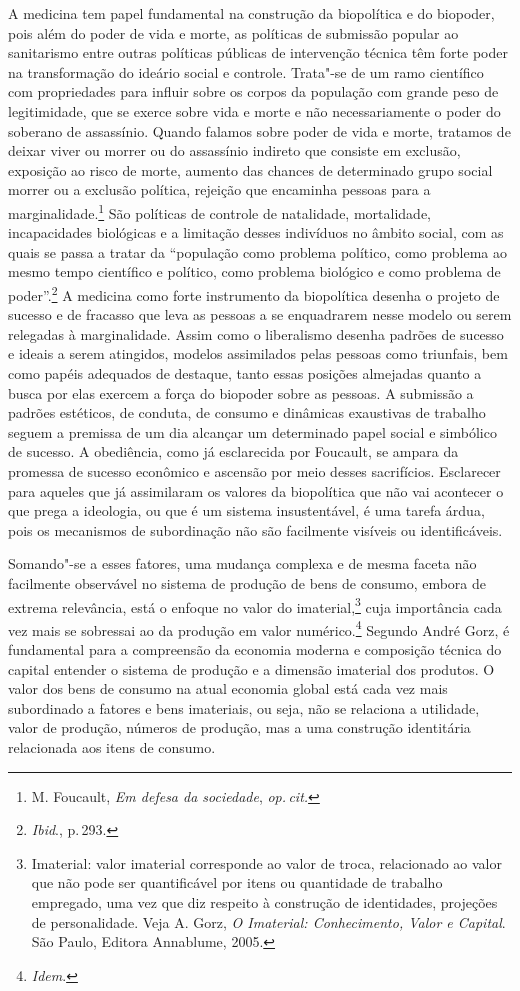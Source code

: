 A medicina tem papel fundamental na construção da biopolítica e do
biopoder, pois além do poder de vida e morte, as políticas de submissão
popular ao sanitarismo entre outras políticas públicas de intervenção
técnica têm forte poder na transformação do ideário social e controle.
Trata"-se de um ramo científico com propriedades para influir sobre os
corpos da população com grande peso de legitimidade, que se exerce sobre
vida e morte e não necessariamente o poder do soberano de assassínio.
Quando falamos sobre poder de vida e morte, tratamos de deixar viver ou
morrer ou do assassínio indireto que consiste em exclusão, exposição ao
risco de morte, aumento das chances de determinado grupo social morrer
ou a exclusão política, rejeição que encaminha pessoas para a
marginalidade.\footnote{M. Foucault, \textit{Em defesa da sociedade}, \textit{op.\,cit.}} São políticas de controle de natalidade,
mortalidade, incapacidades biológicas e a limitação desses indivíduos no
âmbito social, com as quais se passa a tratar da ``população como
problema político, como problema ao mesmo tempo científico e político,
como problema biológico e como problema de poder''.\footnote{\textit{Ibid}., p.\,293.} A medicina como
forte instrumento da biopolítica desenha o projeto de sucesso e de
fracasso que leva as pessoas a se enquadrarem nesse modelo ou serem
relegadas à marginalidade. Assim como o liberalismo desenha padrões de
sucesso e ideais a serem atingidos, modelos assimilados pelas pessoas
como triunfais, bem como papéis adequados de destaque, tanto essas
posições almejadas quanto a busca por elas exercem a força do biopoder
sobre as pessoas. A submissão a padrões estéticos, de conduta, de
consumo e dinâmicas exaustivas de trabalho seguem a premissa de um dia
alcançar um determinado papel social e simbólico de sucesso. A
obediência, como já esclarecida por Foucault, se ampara da promessa
de sucesso econômico e ascensão por meio desses sacrifícios. Esclarecer
para aqueles que já assimilaram os valores da biopolítica que não vai
acontecer o que prega a ideologia, ou que é um sistema insustentável, é
uma tarefa árdua, pois os mecanismos de subordinação não são facilmente
visíveis ou identificáveis.

Somando"-se a esses fatores, uma mudança complexa e de mesma faceta não
facilmente observável no sistema de produção de bens de consumo, embora
de extrema relevância, está o enfoque no valor do imaterial,\footnote{Imaterial:
  valor imaterial corresponde ao valor de troca, relacionado ao valor
  que não pode ser quantificável por itens ou quantidade de trabalho
  empregado, uma vez que diz respeito à construção de identidades,
  projeções de personalidade. Veja A. Gorz, \textit{O Imaterial: Conhecimento, Valor e Capital}. São Paulo, Editora Annablume, 2005.} cuja importância cada vez
mais se sobressai ao da produção em valor numérico.\footnote{\textit{Idem}.} Segundo
André Gorz, é fundamental para a compreensão da economia moderna e
composição técnica do capital entender o sistema de produção e a
dimensão imaterial dos produtos. O valor dos bens de consumo na atual
economia global está cada vez mais subordinado a fatores e bens
imateriais, ou seja, não se relaciona a utilidade, valor de produção,
números de produção, mas a uma construção identitária relacionada aos
itens de consumo.


